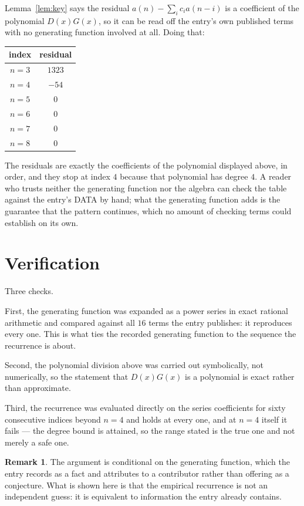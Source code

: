 \documentclass[11pt,a4paper]{article}
\theoremstyle{plain}
\theoremstyle{definition}
\newtheorem{remark}[theorem]{Remark}
\begin{document}
Lemma~\ref{lem:key} says the residual $a(n)-\sum_ic_ia(n-i)$ is a coefficient of the
polynomial $D(x)G(x)$, so it can be read off the entry's own published terms with no
generating function involved at all. Doing that:
\begin{center}
\begin{tabular}{cc}
index & residual \\ \hline
$n=3$ & $1323$ \\
$n=4$ & $-54$ \\
$n=5$ & $0$ \\
$n=6$ & $0$ \\
$n=7$ & $0$ \\
$n=8$ & $0$
\end{tabular}
\end{center}
The residuals are exactly the coefficients of the polynomial displayed above, in order, and
they stop at index $4$ because that polynomial has degree $4$. A reader who trusts
neither the generating function nor the algebra can check the table against the entry's DATA
by hand; what the generating function adds is the guarantee that the pattern continues, which
no amount of checking terms could establish on its own.

\section{Verification}

Three checks.

First, the generating function was expanded as a power series in exact rational arithmetic and
compared against all $16$ terms the entry publishes: it reproduces every one. This is
what ties the recorded generating function to the sequence the recurrence is about.

Second, the polynomial division above was carried out symbolically, not numerically, so the
statement that $D(x)G(x)$ is a polynomial is exact rather than approximate.

Third, the recurrence was evaluated directly on the series coefficients for sixty consecutive
indices beyond $n=4$ and holds at every one, and at $n=4$ itself it fails --- the
degree bound is attained, so the range stated is the true one and not merely a safe one.

\begin{remark}
The argument is conditional on the generating function, which the entry records as a fact and
attributes to a contributor rather than offering as a conjecture. What is shown here is that
the empirical recurrence is not an independent guess: it is equivalent to information the
entry already contains.
\end{remark}
\end{document}
